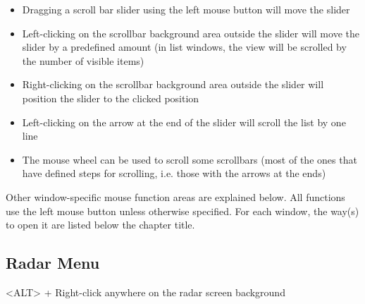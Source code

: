 \documentclass[a4paper,oneside,11pt]{memoir}
\begin{document}
\begin{itemize}
    \item Dragging a scroll bar slider using the left mouse button will move the slider
    \item Left-clicking on the scrollbar background area outside the slider will move the slider by a predefined amount (in list windows, the view will be scrolled by the number of visible items)
    \item Right-clicking on the scrollbar background area outside the slider will position the slider to the clicked position
    \item Left-clicking on the arrow at the end of the slider will scroll the list by one line
    \item The mouse wheel can be used to scroll some scrollbars (most of the ones that have defined steps for scrolling, i.e. those with the arrows at the ends)
\end{itemize}

\bigskip

Other window-specific mouse function areas are explained below. All functions use the left mouse button unless otherwise specified. For each window, the way(s) to open it are listed below the chapter title.

\subsection{Radar Menu}
\label{menu:radarm}

<ALT> + Right-click anywhere on the radar screen background

\end{document}
